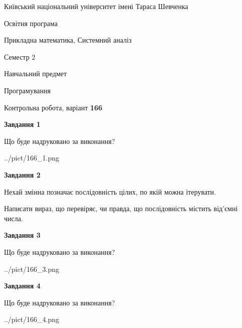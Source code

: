 \documentclass[12pt, ukrainian]{article}
\begin{document}
{{\begin {small}\par
{ \center  Київський національний університет імені Тараса Шевченка \par}
{\parbox {5 cm}{Освітня програма \hfill}{\parbox {8 cm}{Прикладна математика, Системний аналіз \hfill}}\parbox {5 cm}{\hfill Семестр 2}}\par
{\parbox {5 cm} {Навчальний предмет \hfill}\parbox {7 cm}{Програмування \hfill}\parbox {6cm}{\hfill}\par}\vspace{-7pt} \end{small}}{\center Контрольна робота, варіант  \No \textbf
{ 166 }\par}}
{
\begin {large}
{\begin {center}\textbf{Завдання 1}\end {center}}\par
Що буде надруковано за виконання?\par\par
\begin{center}
	{../pict/166_1.png}
\end{center}
\newpage

{\begin {center}\textbf{Завдання 2}\end {center}}\par
Нехай змінна  позначає послідовність цілих, по якій можна ітерувати.

Написати вираз, що перевіряє, чи правда, що послідовність  містить від’ємні числа.\par
\newpage

{\begin {center}\textbf{Завдання 3}\end {center}}\par
Що буде надруковано за виконання?\par
\begin{center}
	{../pict/166_3.png}
\end{center}
\newpage

{\begin {center}\textbf{Завдання 4}\end {center}}\par
Що буде надруковано за виконання?\par
\begin{center}
	{../pict/166_4.png}
\end{center}
\newpage


\end{large}}
\end{document}
